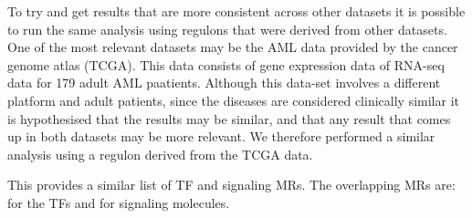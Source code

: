\documentclass[10pt, letterpaper, twoside, english]{article}
\begin{document}
To try and get results that are more consistent across other datasets it is possible to run the same
analysis using regulons that were derived from other datasets. 
One of the most relevant datasets may be the AML data provided by the cancer genome atlas (TCGA).
This data consists of gene expression data of RNA-seq data for 179 adult AML paatients.
Although this data-set involves a different platform and adult patients, 
since the diseases are considered clinically similar it is hypothesised that the results
may be similar, and that any result that comes up in both datasets may be more relevant.
We therefore performed a similar analysis using a regulon derived from the TCGA data.

This provides a similar list of TF and signaling MRs. 
The overlapping MRs are:
for the TFs and
for signaling molecules.

\end{document}
